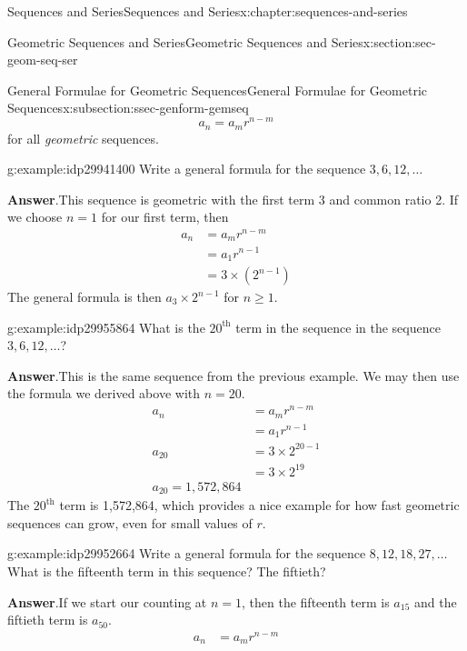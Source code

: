\documentclass[twoside,10pt,]{book}
\newcommand{\blocktitlefont}{\relax}
\numberwithin{equation}{section}
\newcommand{\upth}[1]{{#1^{\text{th}}}}
\newcommand{\amp}{&}
\begin{document}
\begin{chapterptx}{Sequences and Series}{}{Sequences and Series}{}{}{x:chapter:sequences-and-series}
\begin{sectionptx}{Geometric Sequences and Series}{}{Geometric Sequences and Series}{}{}{x:section:sec-geom-seq-ser}
\begin{subsectionptx}{General Formulae for Geometric Sequences}{}{General Formulae for Geometric Sequences}{}{}{x:subsection:ssec-genform-gemseq}
\begin{equation*}
a_n=a_m r^{n-m}
\end{equation*}
for all \emph{geometric} sequences. \begin{example}{}{g:example:idp29941400}%
Write a general formula for the sequence \(3, 6, 12, \ldots\)\par\smallskip%
\noindent\textbf{\blocktitlefont Answer}.\label{g:answer:idp29942168}{}\hypertarget{g:answer:idp29942168}{}\quad{}This sequence is geometric with the first term 3 and common ratio 2.  If we choose \(n = 1\) for our first term, then%
\begin{align*}
a_n \amp = a_m r^{n-m}\\
\amp = a_1 r^{n-1}\\
\amp = 3\times\left(2^{n-1}\right)
\end{align*}
The general formula is then \(a_3\times 2^{n-1}\) for \(n\ge 1\).\end{example}
 \begin{example}{}{g:example:idp29955864}%
What is the \(\upth{20}\) term in the sequence in the sequence \(3, 6, 12, \ldots\)?\par\smallskip%
\noindent\textbf{\blocktitlefont Answer}.\label{g:answer:idp29954840}{}\hypertarget{g:answer:idp29954840}{}\quad{}This is the same sequence from the previous example.  We may then use the formula we derived above with \(n = 20\).%
\begin{align*}
a_n\amp = a_m r^{n-m}\\
\amp = a_1 r^{n-1}\\
a_{20}\amp = 3\times 2^{20-1}\\
\amp = 3\times 2^{19}\\
a_{20}=1,572,864
\end{align*}
The \(\upth{20}\) term is 1,572,864, which provides a nice example for how fast geometric sequences can grow, even for small values of \(r\).\end{example}
 \begin{example}{}{g:example:idp29952664}%
Write a general formula for the sequence \(8, 12, 18, 27, \ldots\)  What is the fifteenth term in this sequence?  The fiftieth?\par\smallskip%
\noindent\textbf{\blocktitlefont Answer}.\label{g:answer:idp29955096}{}\hypertarget{g:answer:idp29955096}{}\quad{}If we start our counting at \(n=1\), then the fifteenth term is \(a_{15}\) and the fiftieth term is \(a_{50}\).%
\begin{align*}
a_n\amp = a_m r^{n-m}\\

\end{align*}
\end{example}
\end{subsectionptx}
\end{sectionptx}
\end{chapterptx}
\end{document}
